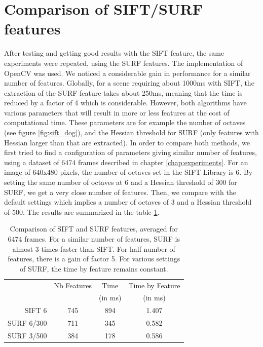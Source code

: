 \section{Comparison of SIFT/SURF features}
After testing and getting good results with the \gls{SIFT} feature, the same experiments were repeated, using the \gls{SURF} features. The implementation of OpenCV was used. We noticed a considerable gain in performance for a similar number of features. Globally, for a scene requiring about 1000ms with \gls{SIFT}, the extraction of the \gls{SURF} feature takes about 250ms, meaning that the time is reduced by a factor of 4 which is considerable.
However, both algorithms have various parameters that will result in more or less features at the cost of computational time. These parameters are for example the number of octaves (see figure \ref{fig:sift_dog}), and the Hessian threshold for SURF (only features with Hessian larger than that are extracted). In order to compare both methods, we first tried to find a configuration of parameters giving similar number of features, using a dataset of 6474 frames described in chapter \ref{chap:experiments}. For an image of 640x480 pixels, the number of octaves set in the SIFT Library is 6. By setting the same number of octaves at 6 and a Hessian threshold of 300 for \gls{SURF}, we get a very close number of features. Then, we compare with the default settings which implies a number of octaves of 3 and a Hessian threshold of 500. The results are summarized in the table \ref{tab:stats_features}.

\begin{table}[h]
 \begin{center}
 \begin{tabular}{r|ccc}
 & Nb Features & Time & Time by Feature \\
 &  & (in ms) & (in ms) \\
 \hline
 SIFT 6 & 745 & 894 & 1.407\\
 SURF 6/300 & 711  & 345  & 0.582 \\
 SURF 3/500 & 384 & 178 & 0.586 \\
 \end{tabular}
\caption{Comparison of SIFT and SURF features, averaged for 6474 frames. For a similar number of features, SURF is almost 3 times faster than SIFT. For half number of features, there is a gain of factor 5. For various settings of SURF, the time by feature remains constant.}
\label{tab:stats_features}
\end{center}
\end{table}

